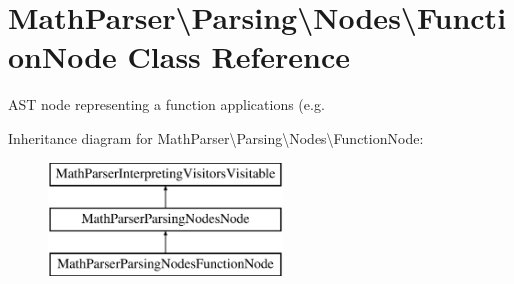 \hypertarget{classMathParser_1_1Parsing_1_1Nodes_1_1FunctionNode}{\section{Math\-Parser\textbackslash{}Parsing\textbackslash{}Nodes\textbackslash{}Function\-Node Class Reference}
\label{classMathParser_1_1Parsing_1_1Nodes_1_1FunctionNode}
}


A\-S\-T node representing a function applications (e.\-g.  


Inheritance diagram for Math\-Parser\textbackslash{}Parsing\textbackslash{}Nodes\textbackslash{}Function\-Node\-:\begin{figure}[H]
\begin{center}
\leavevmode
\includegraphics[height=3.000000cm]{classMathParser_1_1Parsing_1_1Nodes_1_1FunctionNode}
\end{center}
\end{figure}
